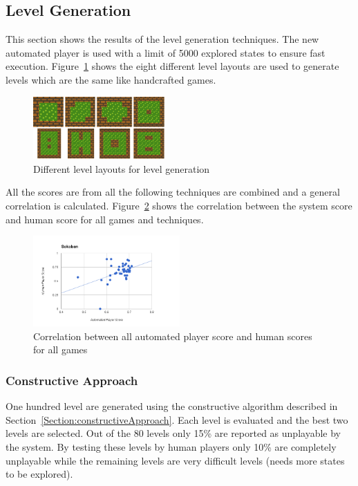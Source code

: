 \documentclass[letterpaper]{article}
\newcommand{\secref}[1]{Section~\ref{Section:#1}}
\newcommand{\figref}[1]{Figure~\ref{Figure:#1}}
\begin{document}
\subsection{Level Generation}
This section shows the results of the level generation techniques. The new automated player is used with a limit of 5000 explored states to ensure fast execution. \figref{levelLayouts} shows the eight different level layouts are used to generate levels which are the same like handcrafted games.\\\par
\begin{figure}
  	\centering
    \includegraphics[width=0.45\textwidth]{Images/levelLayouts}
    \caption{Different level layouts for level generation}
    \label{Figure:levelLayouts}
\end{figure}

All the scores are from all the following techniques are combined and a general correlation is calculated. \figref{totalCorrelation} shows the correlation between the system score and human score for all games and techniques.

\begin{figure}
  	\centering
    \includegraphics[width=0.5\textwidth]{Images/sokobanCorrelation}
    \caption{Correlation between all automated player score and human scores for all games}
    \label{Figure:totalCorrelation}
\end{figure}

\subsubsection{Constructive Approach}
One hundred level are generated using the constructive algorithm described in \secref{constructiveApproach}. Each level is evaluated and the best two levels are selected. Out of the 80 levels only 15\% are reported as unplayable by the system. By testing these levels by human players only 10\% are completely unplayable while the remaining levels are very difficult levels (needs more states to be explored).
\end{document}
